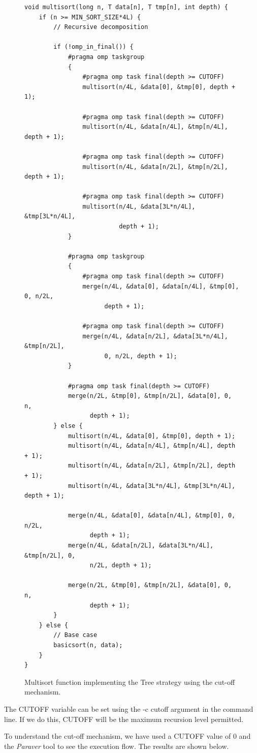 \documentclass[12pt, a4paper]{article}
\begin{document}
\begin{figure}[H]
\begin{lstlisting}
void multisort(long n, T data[n], T tmp[n], int depth) {
    if (n >= MIN_SORT_SIZE*4L) {
        // Recursive decomposition
        
        if (!omp_in_final()) {
			#pragma omp taskgroup
			{
				#pragma omp task final(depth >= CUTOFF)
				multisort(n/4L, &data[0], &tmp[0], depth + 1);
				
				#pragma omp task final(depth >= CUTOFF)
				multisort(n/4L, &data[n/4L], &tmp[n/4L], depth + 1);
				
				#pragma omp task final(depth >= CUTOFF)
				multisort(n/4L, &data[n/2L], &tmp[n/2L], depth + 1);
				
				#pragma omp task final(depth >= CUTOFF)
				multisort(n/4L, &data[3L*n/4L], &tmp[3L*n/4L],
						  depth + 1);
			}

			#pragma omp taskgroup
			{
				#pragma omp task final(depth >= CUTOFF)
				merge(n/4L, &data[0], &data[n/4L], &tmp[0], 0, n/2L,
					  depth + 1);
				
				#pragma omp task final(depth >= CUTOFF)
				merge(n/4L, &data[n/2L], &data[3L*n/4L], &tmp[n/2L],
					  0, n/2L, depth + 1);
			}
			
			#pragma omp task final(depth >= CUTOFF)
			merge(n/2L, &tmp[0], &tmp[n/2L], &data[0], 0, n, 
				  depth + 1);
		} else {
			multisort(n/4L, &data[0], &tmp[0], depth + 1);
			multisort(n/4L, &data[n/4L], &tmp[n/4L], depth + 1);
			multisort(n/4L, &data[n/2L], &tmp[n/2L], depth + 1);
			multisort(n/4L, &data[3L*n/4L], &tmp[3L*n/4L], depth + 1);

			merge(n/4L, &data[0], &data[n/4L], &tmp[0], 0, n/2L,
				  depth + 1);
			merge(n/4L, &data[n/2L], &data[3L*n/4L], &tmp[n/2L], 0,
				  n/2L, depth + 1);
			
			merge(n/2L, &tmp[0], &tmp[n/2L], &data[0], 0, n, 
				  depth + 1);
		}
	} else {
		// Base case
		basicsort(n, data);
	}
}
\end{lstlisting}

\caption{Multisort function implementing the Tree strategy using the cut-off mechanism.}
\end{figure}

The CUTOFF variable can be set using the -c cutoff argument in the command line. If we do this, CUTOFF will be the maximum recursion level permitted.

To understand the cut-off mechanism, we have used a CUTOFF value of 0 and the \textit{Paraver} tool to see the execution flow. The results are shown below.
\end{document}
